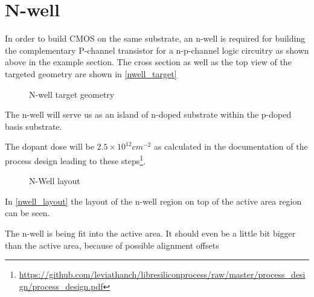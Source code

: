 \section{N-well}\label{nwell_chapter}
In order to build CMOS on the same substrate, an n-well is required for building the complementary P-channel transistor for a n-p-channel logic circuitry as shown above in the example section.
The cross section as well as the top view of the targeted geometry are shown in \autoref{nwell_target}
\begin{figure}[H]
	\centering
	\begin{tikzpicture}[node distance = 3cm, auto, thick,scale=\CrossAndTopSectionBig, every node/.style={transform shape}]
		
	\end{tikzpicture}
	\begin{tikzpicture}[node distance = 3cm, auto, thick,scale=\CrossAndTopSectionBig, every node/.style={transform shape}]
		
	\end{tikzpicture}
	\caption{N-well target geometry}
	\label{nwell_target}
\end{figure}

The n-well will serve us as an island of n-doped substrate within the p-doped basis substrate.

The dopant dose will be $2.5\times10^{12}cm^{-2}$ as calculated in the documentation of the process design leading to these steps\footnote{\url{https://github.com/leviathanch/libresiliconprocess/raw/master/process_design/process_design.pdf}}.

\begin{figure}[H]
	\centering
	\begin{tikzpicture}[node distance =1cm, auto, thick,scale=\VLSILayout, every node/.style={transform shape}]
		
	\end{tikzpicture}
	\caption{N-Well layout}
	\label{nwell_layout}
\end{figure}

In \autoref{nwell_layout} the layout of the n-well region on top of the active area region can be seen.

The n-well is being fit into the active area. It should even be a little bit bigger than the active area, because of possible alignment offsets

\newpage

